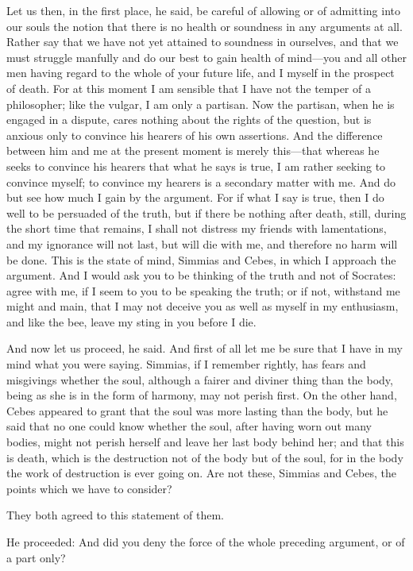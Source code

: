 Let us then, in the first place, he said, be careful of allowing or of
admitting into our souls the notion that there is no health or soundness
in any arguments at all. Rather say that we have not yet attained to
soundness in ourselves, and that we must struggle manfully and do our best
to gain health of mind—you and all other men having regard to the
whole of your future life, and I myself in the prospect of death. For at
this moment I am sensible that I have not the temper of a philosopher;
like the vulgar, I am only a partisan. Now the partisan, when he is
engaged in a dispute, cares nothing about the rights of the question, but
is anxious only to convince his hearers of his own assertions. And the
difference between him and me at the present moment is merely this—that
whereas he seeks to convince his hearers that what he says is true, I am
rather seeking to convince myself; to convince my hearers is a secondary
matter with me. And do but see how much I gain by the argument. For if
what I say is true, then I do well to be persuaded of the truth, but if
there be nothing after death, still, during the short time that remains, I
shall not distress my friends with lamentations, and my ignorance will not
last, but will die with me, and therefore no harm will be done. This is
the state of mind, Simmias and Cebes, in which I approach the argument.
And I would ask you to be thinking of the truth and not of Socrates: agree
with me, if I seem to you to be speaking the truth; or if not, withstand
me might and main, that I may not deceive you as well as myself in my
enthusiasm, and like the bee, leave my sting in you before I die.

And now let us proceed, he said. And first of all let me be sure that I
have in my mind what you were saying. Simmias, if I remember rightly, has
fears and misgivings whether the soul, although a fairer and diviner thing
than the body, being as she is in the form of harmony, may not perish
first. On the other hand, Cebes appeared to grant that the soul was more
lasting than the body, but he said that no one could know whether the
soul, after having worn out many bodies, might not perish herself and
leave her last body behind her; and that this is death, which is the
destruction not of the body but of the soul, for in the body the work of
destruction is ever going on. Are not these, Simmias and Cebes, the points
which we have to consider?

They both agreed to this statement of them.

He proceeded: And did you deny the force of the whole preceding argument,
or of a part only?

